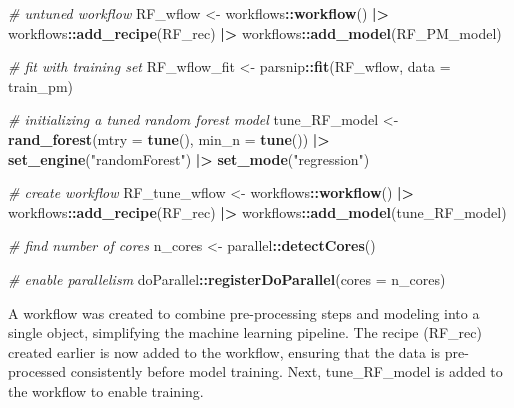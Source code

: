 \documentclass[
]{article}
\newenvironment{Shaded}{\begin{snugshade}}{\end{snugshade}}
\newcommand{\AttributeTok}[1]{\textcolor[rgb]{0.13,0.29,0.53}{#1}}
\newcommand{\CommentTok}[1]{\textcolor[rgb]{0.56,0.35,0.01}{\textit{#1}}}
\newcommand{\FunctionTok}[1]{\textcolor[rgb]{0.13,0.29,0.53}{\textbf{#1}}}
\newcommand{\NormalTok}[1]{#1}
\newcommand{\OtherTok}[1]{\textcolor[rgb]{0.56,0.35,0.01}{#1}}
\newcommand{\SpecialCharTok}[1]{\textcolor[rgb]{0.81,0.36,0.00}{\textbf{#1}}}
\newcommand{\StringTok}[1]{\textcolor[rgb]{0.31,0.60,0.02}{#1}}
\begin{document}
\begin{Shaded}
\begin{Highlighting}[]
\CommentTok{\# untuned workflow}
\NormalTok{RF\_wflow }\OtherTok{\textless{}{-}}\NormalTok{ workflows}\SpecialCharTok{::}\FunctionTok{workflow}\NormalTok{() }\SpecialCharTok{|\textgreater{}}
\NormalTok{  workflows}\SpecialCharTok{::}\FunctionTok{add\_recipe}\NormalTok{(RF\_rec) }\SpecialCharTok{|\textgreater{}}
\NormalTok{  workflows}\SpecialCharTok{::}\FunctionTok{add\_model}\NormalTok{(RF\_PM\_model)}

\CommentTok{\# fit with training set}
\NormalTok{RF\_wflow\_fit }\OtherTok{\textless{}{-}}\NormalTok{ parsnip}\SpecialCharTok{::}\FunctionTok{fit}\NormalTok{(RF\_wflow, }\AttributeTok{data =}\NormalTok{ train\_pm)}

\CommentTok{\# initializing a tuned random forest model}
\NormalTok{tune\_RF\_model }\OtherTok{\textless{}{-}} \FunctionTok{rand\_forest}\NormalTok{(}\AttributeTok{mtry =} \FunctionTok{tune}\NormalTok{(), }\AttributeTok{min\_n =} \FunctionTok{tune}\NormalTok{()) }\SpecialCharTok{|\textgreater{}}
  \FunctionTok{set\_engine}\NormalTok{(}\StringTok{"randomForest"}\NormalTok{) }\SpecialCharTok{|\textgreater{}}
  \FunctionTok{set\_mode}\NormalTok{(}\StringTok{"regression"}\NormalTok{)}

\CommentTok{\# create workflow}
\NormalTok{RF\_tune\_wflow }\OtherTok{\textless{}{-}}\NormalTok{ workflows}\SpecialCharTok{::}\FunctionTok{workflow}\NormalTok{() }\SpecialCharTok{|\textgreater{}}
\NormalTok{  workflows}\SpecialCharTok{::}\FunctionTok{add\_recipe}\NormalTok{(RF\_rec) }\SpecialCharTok{|\textgreater{}}
\NormalTok{  workflows}\SpecialCharTok{::}\FunctionTok{add\_model}\NormalTok{(tune\_RF\_model)}

\CommentTok{\# find number of cores}
\NormalTok{n\_cores }\OtherTok{\textless{}{-}}\NormalTok{ parallel}\SpecialCharTok{::}\FunctionTok{detectCores}\NormalTok{()}

\CommentTok{\# enable parallelism}
\NormalTok{doParallel}\SpecialCharTok{::}\FunctionTok{registerDoParallel}\NormalTok{(}\AttributeTok{cores =}\NormalTok{ n\_cores)}
\end{Highlighting}
\end{Shaded}

A workflow was created to combine pre-processing steps and modeling into
a single object, simplifying the machine learning pipeline. The recipe
(RF\_rec) created earlier is now added to the workflow, ensuring that
the data is pre-processed consistently before model training. Next,
tune\_RF\_model is added to the workflow to enable training.
\end{document}
